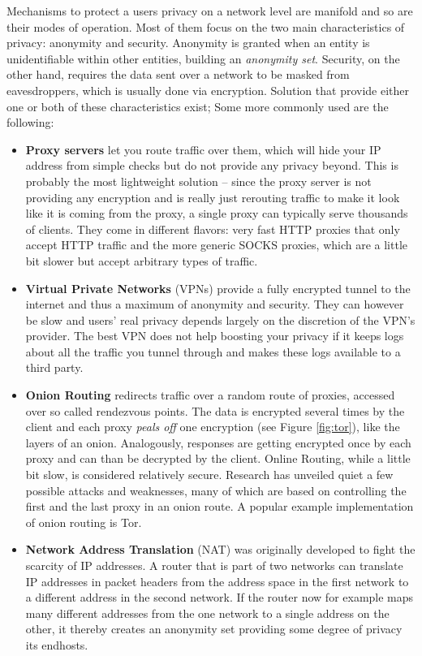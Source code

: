 \documentclass{acm_proc_article-sp}
\begin{document}
Mechanisms to protect a users privacy on a network level are manifold and so are their modes of operation. Most of them focus on the two main characteristics of privacy: anonymity and security. Anonymity is granted when an entity is unidentifiable within other entities, building an \emph{anonymity set}. Security, on the other hand, requires the data sent over a network to be masked from eavesdroppers, which is usually done via encryption. Solution that provide either one or both of these characteristics exist; Some more commonly used are the following:

\begin{itemize}
\item \textbf{Proxy servers} let you route traffic over them, which will hide your IP address from simple checks but do not provide any privacy beyond. This is probably the most lightweight solution -- since the proxy server is not providing any encryption and is really just rerouting traffic to make it look like it is coming from the proxy, a single proxy can typically serve thousands of clients. They come in different flavors: very fast HTTP proxies that only accept HTTP traffic and the more generic SOCKS proxies, which are a little bit slower but accept arbitrary types of traffic.
\item \textbf{Virtual Private Networks} (VPNs) provide a fully encrypted tunnel to the internet and thus a maximum of anonymity and security. They can however be slow and users' real privacy depends largely on the discretion of the VPN's provider. The best VPN does not help boosting your privacy if it keeps logs about all the traffic you tunnel through and makes these logs available to a third party. 
\item \textbf{Onion Routing} redirects traffic over a random route of proxies, accessed over so called rendezvous points. The data is encrypted several times by the client and each proxy \emph{peals off} one encryption (see Figure \ref{fig:tor}), like the layers of an onion. Analogously, responses are getting encrypted once by each proxy and can than be decrypted by the client. Online Routing, while a little bit slow, is considered relatively secure. Research has unveiled quiet a few possible attacks and weaknesses, many of which are based on controlling the first and the last proxy in an onion route. A popular example implementation of onion routing is Tor.
\item \textbf{Network Address Translation} (NAT) was originally developed to fight the scarcity of IP addresses. A router that is part of two networks can translate IP addresses in packet headers from the address space in the first network to a different address in the second network. If the router now for example maps many different addresses from the one network to a single address on the other, it thereby creates an anonymity set providing some degree of privacy its endhosts.
\end{itemize}
\end{document}

